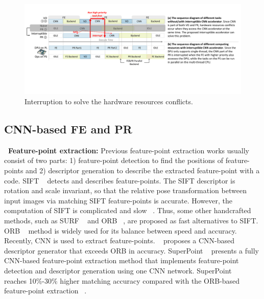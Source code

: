 
\label{sec:relate}


\begin{figure}[t]
	\centering
    \vspace{-0.1cm} 
    \setlength{\abovecaptionskip}{0cm} 
    \setlength{\belowcaptionskip}{-0.2cm} 
	\includegraphics[width=0.95\linewidth]{fig/interDPR.pdf}
    \caption{Interruption to solve the hardware resources conflicts.  
    }
	\label{fig:interDPR}
\end{figure}


\subsection{ CNN-based FE and PR }

\textbf{\quad \ Feature-point extraction:} Previous feature-point extraction works usually consist of two parts: 1) feature-point detection to find the positions of feature-points and 2) descriptor generation to describe the extracted feature-point with a code.
SIFT  ~\cite{Lowe-478}  detects and describes feature-points. The SIFT descriptor is rotation and scale invariant, so that the relative pose transformation between input images via matching SIFT feature-points is accurate. However, the computation of SIFT is complicated and slow  ~\cite{bay2006surf}. Thus, some other handcrafted methods, such as SURF ~\cite{bay2006surf} and ORB  ~\cite{Mur-Artal:2017281}, are proposed as fast alternatives to SIFT. ORB  ~\cite{Mur-Artal:2017281} method is widely used for its balance between speed and accuracy.
Recently, CNN is used to extract feature-points.  ~\cite{simo2015discriminative} proposes a CNN-based descriptor generator that exceeds ORB in accuracy.
SuperPoint  ~\cite{detone2018superpoint} presents a fully CNN-based feature-point extraction method that implements feature-point detection and descriptor generation using one CNN network. SuperPoint ~\cite{detone2018superpoint} reaches 10\%-30\% higher matching accuracy compared with the ORB-based feature-point extraction  ~\cite{Mur-Artal:2017281}. 

